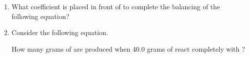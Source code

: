 \documentclass[main.tex]{subfiles}
\begin{document}
\begin{fullwidth}
\begin{multicols*}{2}
\begin{enumerate}

\item  What coefficient is placed in front of  to complete the balancing of the following equation?
\begin{center}	\end{center}
 \begin{enumerate}[label=(\alph*)]\vspace{-0.5cm}
\end{enumerate}\vspace{-0.5cm}

\item  Consider the following equation. 
\begin{center}\end{center}	
How many grams of  are produced when 40.0 grams of  react completely with ?
 \begin{enumerate}[label=(\alph*)]\vspace{-0.5cm}
\end{enumerate}\vspace{-0.5cm}


\end{enumerate}
\end{multicols*}
\end{fullwidth}
\end{document}
